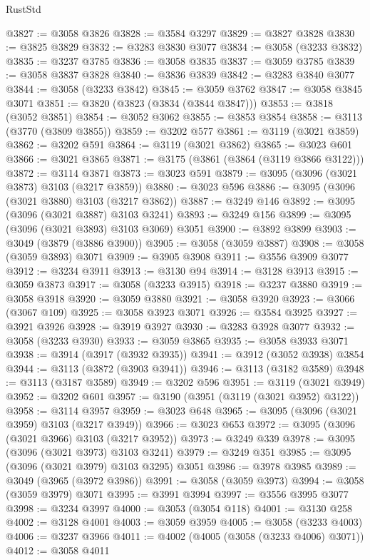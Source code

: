 \begin{lexlean}{RustStd}
\begin{coremodule}
@3827 := @3058 @3826
@3828 := @3584 @3297
@3829 := @3827 @3828
@3830 := @3825 @3829
@3832 := @3283 @3830 @3077
@3834 := @3058 (@3233 @3832)
@3835 := @3237 @3785
@3836 := @3058 @3835
@3837 := @3059 @3785
@3839 := @3058 @3837 @3828
@3840 := @3836 @3839
@3842 := @3283 @3840 @3077
@3844 := @3058 (@3233 @3842)
@3845 := @3059 @3762
@3847 := @3058 @3845 @3071
@3851 := @3820 (@3823 (@3834 (@3844 @3847)))
@3853 := @3818 (@3052 @3851)
@3854 := @3052 @3062
@3855 := @3853 @3854
@3858 := @3113 (@3770 (@3809 @3855))
@3859 := @3202 @577
@3861 := @3119 (@3021 @3859)
@3862 := @3202 @591
@3864 := @3119 (@3021 @3862)
@3865 := @3023 @601
@3866 := @3021 @3865
@3871 := @3175 (@3861 (@3864 (@3119 @3866 @3122)))
@3872 := @3114 @3871
@3873 := @3023 @591
@3879 := @3095 (@3096 (@3021 @3873) @3103 (@3217 @3859))
@3880 := @3023 @596
@3886 := @3095 (@3096 (@3021 @3880) @3103 (@3217 @3862))
@3887 := @3249 @146
@3892 := @3095 (@3096 (@3021 @3887) @3103 @3241)
@3893 := @3249 @156
@3899 := @3095 (@3096 (@3021 @3893) @3103 @3069) @3051
@3900 := @3892 @3899
@3903 := @3049 (@3879 (@3886 @3900))
@3905 := @3058 (@3059 @3887)
@3908 := @3058 (@3059 @3893) @3071
@3909 := @3905 @3908
@3911 := @3556 @3909 @3077
@3912 := @3234 @3911
@3913 := @3130 @94
@3914 := @3128 @3913
@3915 := @3059 @3873
@3917 := @3058 (@3233 @3915)
@3918 := @3237 @3880
@3919 := @3058 @3918
@3920 := @3059 @3880
@3921 := @3058 @3920
@3923 := @3066 (@3067 @109)
@3925 := @3058 @3923 @3071
@3926 := @3584 @3925
@3927 := @3921 @3926
@3928 := @3919 @3927
@3930 := @3283 @3928 @3077
@3932 := @3058 (@3233 @3930)
@3933 := @3059 @3865
@3935 := @3058 @3933 @3071
@3938 := @3914 (@3917 (@3932 @3935))
@3941 := @3912 (@3052 @3938) @3854
@3944 := @3113 (@3872 (@3903 @3941))
@3946 := @3113 (@3182 @3589)
@3948 := @3113 (@3187 @3589)
@3949 := @3202 @596
@3951 := @3119 (@3021 @3949)
@3952 := @3202 @601
@3957 := @3190 (@3951 (@3119 (@3021 @3952) @3122))
@3958 := @3114 @3957
@3959 := @3023 @648
@3965 := @3095 (@3096 (@3021 @3959) @3103 (@3217 @3949))
@3966 := @3023 @653
@3972 := @3095 (@3096 (@3021 @3966) @3103 (@3217 @3952))
@3973 := @3249 @339
@3978 := @3095 (@3096 (@3021 @3973) @3103 @3241)
@3979 := @3249 @351
@3985 := @3095 (@3096 (@3021 @3979) @3103 @3295) @3051
@3986 := @3978 @3985
@3989 := @3049 (@3965 (@3972 @3986))
@3991 := @3058 (@3059 @3973)
@3994 := @3058 (@3059 @3979) @3071
@3995 := @3991 @3994
@3997 := @3556 @3995 @3077
@3998 := @3234 @3997
@4000 := @3053 (@3054 @118)
@4001 := @3130 @258
@4002 := @3128 @4001
@4003 := @3059 @3959
@4005 := @3058 (@3233 @4003)
@4006 := @3237 @3966
@4011 := @4002 (@4005 (@3058 (@3233 @4006) @3071))
@4012 := @3058 @4011

\end{coremodule}
\end{lexlean}
